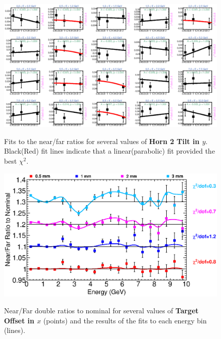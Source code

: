 \begin{figure}[ht]
  \begin{center}
    {\includegraphics[width=5.0in]{figures/Horn2YTilt_nof_fits.eps}}
  \end{center}
\caption{ Fits to the near/far ratios for several values of {\bf Horn 2 Tilt in $y$}. Black(Red) fit lines indicate that a linear(parabolic) fit provided the best $\chi^2$. }
\end{figure}

\begin{figure}[ht]
  \begin{center}
    {\includegraphics[width=6.0in]{figures/TargetXOffset_nof_summary.eps}}
  \end{center}
\caption{ Near/Far double ratios to nominal for several values of {\bf Target Offset in $x$} (points) and the results of the fits to each energy bin (lines).}
\end{figure}

